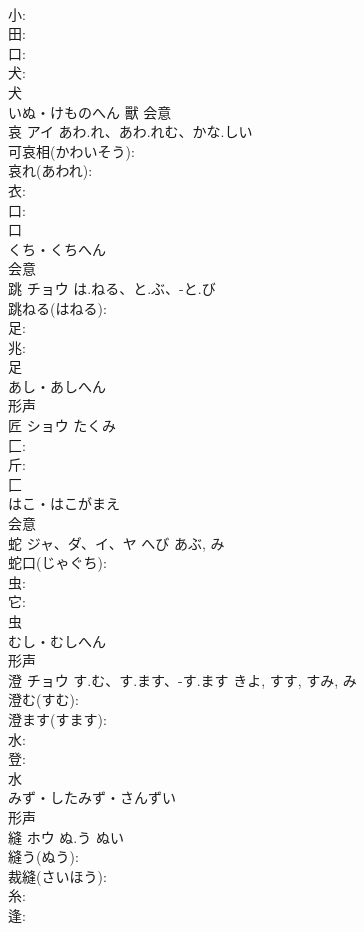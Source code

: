 \documentclass[8pt]{extreport}
\begin{document}
\begin{CJK}{UTF8}{min}
\\	小: 
\\	田: 
\\	口: 
\\	犬: 
\\	犬	
\\	いぬ・けものへん	獸	会意 
\\	哀	アイ	あわ.れ、あわ.れむ、かな.しい		
\\	可哀相(かわいそう): 
\\	哀れ(あわれ): 
\\	衣: 
\\	口: 
\\	口	
\\	くち・くちへん	
\\	会意 
\\	跳	チョウ	は.ねる、と.ぶ、-と.び		
\\	跳ねる(はねる): 
\\	足: 
\\	兆: 
\\	足	
\\	あし・あしへん	
\\	形声 
\\	匠	ショウ	たくみ		
\\	匚: 
\\	斤: 
\\	匚	
\\	はこ・はこがまえ	
\\	会意 
\\	蛇	ジャ、ダ、イ、ヤ	へび	あぶ, み	
\\	蛇口(じゃぐち): 
\\	虫: 
\\	它: 
\\	虫	
\\	むし・むしへん	
\\	形声 
\\	澄	チョウ	す.む、す.ます、-す.ます	きよ, すす, すみ, み	
\\	澄む(すむ): 
\\	澄ます(すます): 
\\	水: 
\\	登: 
\\	水	
\\	みず・したみず・さんずい	
\\	形声 
\\	縫	ホウ	ぬ.う	ぬい	
\\	縫う(ぬう): 
\\	裁縫(さいほう): 
\\	糸: 
\\	逢: 

\end{CJK}
\end{document}

